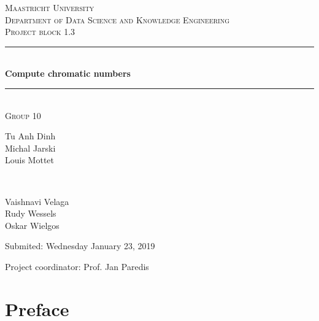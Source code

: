 \documentclass[a4paper]{report}
\begin{document}
	\begin{titlepage} 
		\newcommand{\HRule}{\rule{\linewidth}{0.5mm}} 
		
		\center
		
		\textsc{\LARGE Maastricht University}\\[1.5cm]
		
		\textsc{\Large Department of Data Science and Knowledge Engineering}\\[0.5cm] 
		
		\textsc{\large Project block 1.3}\\[0.5cm] 
		
		\HRule\\[0.4cm]
		
		{\huge\bfseries Compute chromatic numbers}\\[0.4cm] 
		
		\HRule\\[1.5cm]
		
		\textsc{\large Group 10}\\[0.5cm]
		
		\begin{minipage}{0.6\textwidth}
			\begin{flushleft}
				Tu Anh Dinh\\Michal Jarski\\Louis Mottet
			\end{flushleft}
		\end{minipage}
		~
		\begin{minipage}{0.3\textwidth}
			\begin{flushleft}
				Vaishnavi Velaga\\Rudy Wessels\\Oskar Wielgos
			\end{flushleft}
		\end{minipage}
	
		 \vspace{1cm}
		Submited: Wednesday January 23, 2019
		\vspace{3cm}
		\begin{flushleft}
			Project coordinator: Prof. Jan Paredis
		\end{flushleft}
		
	\end{titlepage}
	
	\chapter*{Preface}
\end{document}
